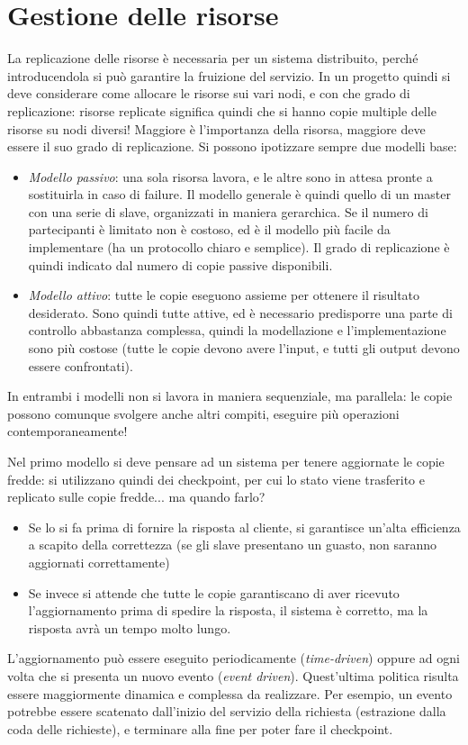 \section{Gestione delle risorse}
La replicazione delle risorse è necessaria per un sistema distribuito, perché 
introducendola si può garantire la
fruizione del servizio. In un progetto quindi si deve considerare come allocare 
le risorse sui vari nodi, e con che
grado di replicazione: risorse replicate significa quindi che si hanno copie 
multiple delle risorse su nodi diversi!
Maggiore è l'importanza della risorsa, maggiore deve essere il suo grado di 
replicazione.
Si possono ipotizzare sempre due modelli base:
\begin{itemize}
 \item \textit{Modello passivo}: una sola risorsa lavora, e le altre sono in 
attesa pronte a sostituirla in caso di
 failure. Il modello generale è quindi quello di un master con una serie di 
slave, organizzati in maniera gerarchica.
 Se il numero di partecipanti è limitato non è costoso, ed è il modello più 
facile da implementare (ha un protocollo
 chiaro e semplice). Il grado di replicazione è quindi indicato dal numero di 
copie passive disponibili.
 \item \textit{Modello attivo}: tutte le copie eseguono assieme per ottenere il 
risultato desiderato. Sono quindi tutte
 attive, ed è necessario predisporre una parte di controllo abbastanza 
complessa, quindi la modellazione e
 l'implementazione sono più costose (tutte le copie devono avere l'input, e 
tutti gli output devono essere confrontati).
\end{itemize}
In entrambi i modelli non si lavora in maniera sequenziale, ma parallela: le 
copie possono comunque svolgere anche
altri compiti, eseguire più operazioni contemporaneamente!

Nel primo modello si deve pensare ad un sistema per tenere aggiornate le copie 
fredde: si utilizzano quindi dei
checkpoint, per cui lo stato viene trasferito e replicato sulle copie fredde... 
ma quando farlo?
\begin{itemize}
 \item Se lo si fa prima di fornire la risposta al cliente, si garantisce 
un'alta efficienza a scapito della
 correttezza (se gli slave presentano un guasto, non saranno aggiornati 
correttamente)
 \item Se invece si attende che tutte le copie garantiscano di aver ricevuto 
l'aggiornamento prima di spedire la
 risposta, il sistema è corretto, ma la risposta avrà un tempo molto lungo.
\end{itemize}
L'aggiornamento può essere eseguito periodicamente (\textit{time-driven}) 
oppure ad ogni volta che si presenta un nuovo
evento (\textit{event driven}). Quest'ultima politica risulta essere 
maggiormente dinamica e complessa da realizzare.
Per esempio, un evento potrebbe essere scatenato dall'inizio del servizio della 
richiesta (estrazione dalla coda delle
richieste), e terminare alla fine per poter fare il checkpoint.

